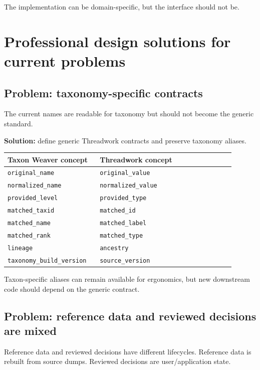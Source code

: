 \documentclass[11pt,a4paper]{article}
\newcommand{\code}[1]{\texttt{#1}}
\begin{document}
The implementation can be domain-specific, but the interface should not be.

\section{Professional design solutions for current problems}

\subsection{Problem: taxonomy-specific contracts}

The current names are readable for taxonomy but should not become the generic standard.

\textbf{Solution:} define generic Threadwork contracts and preserve taxonomy aliases.

\begin{longtable}{p{0.35\linewidth}p{0.55\linewidth}}
\toprule
\textbf{Taxon Weaver concept} & \textbf{Threadwork concept} \\
\midrule
\endhead
\code{original\_name} & \code{original\_value} \\
\code{normalized\_name} & \code{normalized\_value} \\
\code{provided\_level} & \code{provided\_type} \\
\code{matched\_taxid} & \code{matched\_id} \\
\code{matched\_name} & \code{matched\_label} \\
\code{matched\_rank} & \code{matched\_type} \\
\code{lineage} & \code{ancestry} \\
\code{taxonomy\_build\_version} & \code{source\_version} \\
\bottomrule
\end{longtable}

Taxon-specific aliases can remain available for ergonomics, but new downstream code should depend on the generic contract.

\subsection{Problem: reference data and reviewed decisions are mixed}

Reference data and reviewed decisions have different lifecycles. Reference data is rebuilt from source dumps. Reviewed decisions are user/application state.
\end{document}
